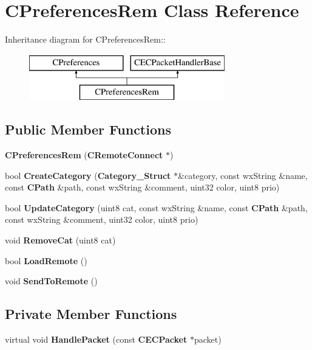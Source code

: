 \section{CPreferencesRem Class Reference}
\label{classCPreferencesRem}
Inheritance diagram for CPreferencesRem::\begin{figure}[H]
\begin{center}
\leavevmode
\includegraphics[height=2cm]{classCPreferencesRem}
\end{center}
\end{figure}
\subsection*{Public Member Functions}
\begin{DoxyCompactItemize}
\item 
{\bfseries CPreferencesRem} ({\bf CRemoteConnect} $\ast$)\label{classCPreferencesRem_a59fdb249dbb1ecebce5ebdd7df73c2f4}

\item 
bool {\bfseries CreateCategory} ({\bf Category\_\-Struct} $\ast$\&category, const wxString \&name, const {\bf CPath} \&path, const wxString \&comment, uint32 color, uint8 prio)\label{classCPreferencesRem_a2c0a32e4c57b1cd3cf28b0482df56224}

\item 
bool {\bfseries UpdateCategory} (uint8 cat, const wxString \&name, const {\bf CPath} \&path, const wxString \&comment, uint32 color, uint8 prio)\label{classCPreferencesRem_a3360d3404c224a7f04617f18ecc19dec}

\item 
void {\bfseries RemoveCat} (uint8 cat)\label{classCPreferencesRem_a910926543fc1123e26811a7c991cdec3}

\item 
bool {\bfseries LoadRemote} ()\label{classCPreferencesRem_aeae9025db7d0b018f69cdf006a62568b}

\item 
void {\bfseries SendToRemote} ()\label{classCPreferencesRem_aac2928280b0098a9fe9cfca1e2670521}

\end{DoxyCompactItemize}
\subsection*{Private Member Functions}
\begin{DoxyCompactItemize}
\item 
virtual void {\bfseries HandlePacket} (const {\bf CECPacket} $\ast$packet)\label{classCPreferencesRem_a76a3a31438819369fa8fded22011856e}

\end{DoxyCompactItemize}
